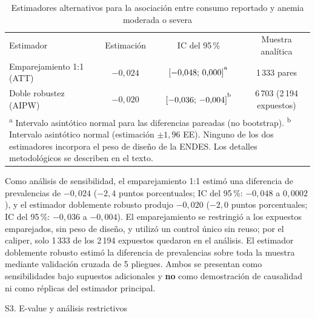 \documentclass[man,11pt,donotrepeattitle,floatsintext]{apa7}
\makeatletter
\renewcommand{\subsection}{\@startsection{subsection}{2}{\z@}%
    {\b@level@two@skip}{\e@level@two@skip}%
    {\normalfont\normalsize\bfseries\raggedright}}
\makeatother
\begin{document}
\begin{table}[htbp]
    \centering
    \caption{Estimadores alternativos para la asociación entre consumo reportado y anemia moderada o severa}
    \label{tab:suplementaria_estimadores}
    \small
    \begingroup
    \renewcommand{\arraystretch}{1.15}
    \setlength{\heavyrulewidth}{0.75pt}
    \setlength{\lightrulewidth}{0.5pt}
    \begin{tabular}{lccc}
        \toprule
        Estimador & Estimación & IC del 95\,\% & Muestra analítica \\
        \noalign{\setlength{\lightrulewidth}{0.75pt}}
        \midrule
        \noalign{\setlength{\lightrulewidth}{0.5pt}}
        Emparejamiento 1:1 (ATT) & $-0{,}024$ & $[-0{,}048;\,0{,}000]^{\textsuperscript{a}}$ & 1\,333 pares  \\
        Doble robustez (AIPW) & $-0{,}020$ & $[-0{,}036;\,-0{,}004]^{\textsuperscript{b}}$ & 6\,703 (2\,194 expuestos)  \\
        \bottomrule
        \multicolumn{4}{p{14.5cm}}{\footnotesize \textsuperscript{a} Intervalo asintótico normal para las diferencias pareadas (no bootstrap). \textsuperscript{b} Intervalo asintótico normal (estimación $\pm 1{,}96$ EE). Ninguno de los dos estimadores incorpora el peso de diseño de la ENDES. Los detalles metodológicos se describen en el texto.} \\
    \end{tabular}
    \endgroup
\end{table}

Como análisis de sensibilidad, el emparejamiento 1:1 estimó una diferencia de prevalencias de $-0{,}024$ ($-2{,}4$ puntos porcentuales; IC del 95\,\%: $-0{,}048$ a $0{,}0002$), y el estimador doblemente robusto produjo $-0{,}020$ ($-2{,}0$ puntos porcentuales; IC del 95\,\%: $-0{,}036$ a $-0{,}004$). El emparejamiento se restringió a los expuestos emparejados, sin peso de diseño, y utilizó un control único sin reuso; por el caliper, solo 1\,333 de los 2\,194 expuestos quedaron en el análisis. El estimador doblemente robusto estimó la diferencia de prevalencias sobre toda la muestra mediante validación cruzada de 5 pliegues. Ambos se presentan como sensibilidades bajo supuestos adicionales y \textbf{no} como demostración de causalidad ni como réplicas del estimador principal.

\subsection{S3. E-value y análisis restrictivos}
\end{document}
